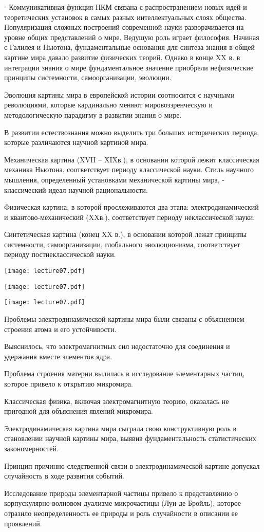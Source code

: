 \documentclass[exam_answers.tex]{subfiles}
\begin{document}
- Коммуникативная функция НКМ связана с распространением новых идей
и теоретических установок в самых разных интеллектуальных слоях
общества.
Популяризация сложных построений современной науки разворачивается на
уровне общих представлений о мире. Ведущую роль играет философия.
Начиная с Галилея и Ньютона, фундаментальные основания для синтеза
знания в общей картине мира давало развитие физических теорий. Однако в
конце XX в. в интеграции знания о мире фундаментальное значение
приобрели нефизические принципы системности, самоорганизации,
эволюции.

Эволюция картины мира в европейской истории соотносится с
научными революциями, которые кардинально меняют
мировоззренческую и методологическую парадигму в развитии
знания о мире.

В развитии естествознания можно выделить три больших
исторических периода, которые различаются научной картиной мира.

Механическая картина (XVII – XIXв.), в основании которой лежит
классическая механика Ньютона, соответствует периоду классической
науки. Стиль научного мышления, определенный установками
механической картины мира, - классический идеал научной
рациональности.

Физическая картина, в которой прослеживаются два этапа:
электродинамический и квантово-механический (XXв.), соответствует
периоду неклассической науки.

Синтетическая картина (конец XX в.), в основании которой лежат
принципы системности, самоорганизации, глобального эволюционизма,
соответствует периоду постнеклассической науки.

\texttt{[image: lecture07.pdf]}

\texttt{[image: lecture07.pdf]}

\texttt{[image: lecture07.pdf]}

Проблемы
электродинамической
картины мира были
связаны с объяснением
строения атома и его
устойчивости.

Выяснилось, что электромагнитных сил недостаточно для
соединения и удержания вместе элементов ядра. 

Проблема строения материи вылилась в исследование
элементарных частиц, которое привело к открытию микромира.

Классическая физика, включая электромагнитную теорию,
оказалась не пригодной для объяснения явлений микромира.

Электродинамическая картина мира сыграла свою конструктивную
роль в становлении научной картины мира, выявив
фундаментальность статистических закономерностей.

Принцип причинно-следственной связи в электродинамической
картине допускал случайность в ходе развития событий.

Исследование природы элементарной частицы привело к
представлению о корпускулярно-волновом дуализме микрочастицы
(Луи де Бройль), которое отразило неопределенность ее природы и
роль случайности в описании ее проявлений.
\end{document}
